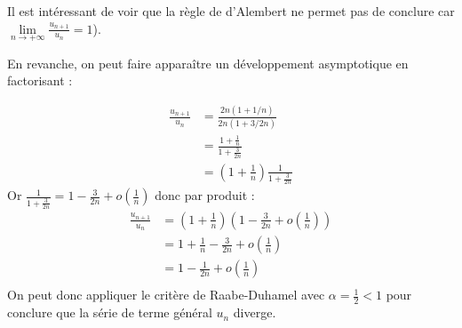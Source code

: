 \begin{enumerate}
{			Il est intéressant de voir que la règle de d'Alembert ne permet pas de conclure car $\lim\limits_{n \to +\infty} \frac{u_{n+1}}{u_n} = 1$). 
			
			En revanche, on peut faire apparaître un développement asymptotique en factorisant :
			
			\begin{align*}
			\frac{u_{n+1}}{u_n} &= \frac{2n(1+1/n)}{2n(1+3/2n)} \\
			&= \frac{1+\frac{1}{n}}{1+\frac{3}{2n}} \\
			&= \left(1+\frac{1}{n} \right) \frac{1}{1+\frac{3}{2n}}
			\end{align*}
			Or $\frac{1}{1+\frac{3}{2n}} = 1-\frac{3}{2n} + o(\frac{1}{n})$ donc par produit : 
			\begin{align*}
			\frac{u_{n+1}}{u_n} &= \left(1+\frac{1}{n} \right) \left(1-\frac{3}{2n} +o\left(\frac{1}{n}\right)  \right) \\
			&= 1 + \frac{1}{n} - \frac{3}{2n} + o\left(\frac{1}{n}\right) \\
			&= 1 - \frac{1}{2n}  + o\left(\frac{1}{n}\right) \\
			\end{align*}
			On peut donc appliquer le critère de Raabe-Duhamel avec $\alpha = \frac{1}{2} <1$ pour conclure que la série de terme général $u_n$ diverge. 
		}
	\end{enumerate}
